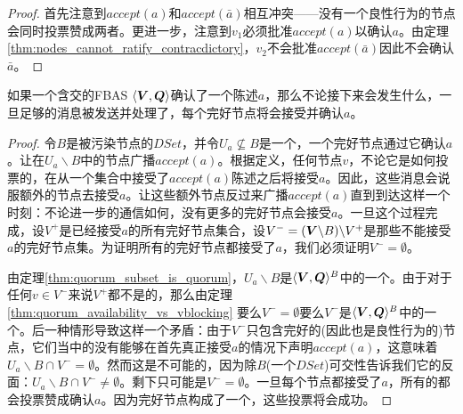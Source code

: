 \begin{proof}
	首先注意到$accept(a)$和$accept(\bar a)$相互冲突——没有一个良性行为的节点会同时投票赞成两者。更进一步，注意到$v_1$必须批准$accept(a)$以确认$a$。由定理\ref{thm:nodes_cannot_ratify_contracdictory}，$v_2$不会批准$accept(\bar a)$因此不会确认$\bar a$。
\end{proof}

\begin{theorem}\label{thm:confirmed_stats_keep_liveness}
	如果一个含{\quorum}交的FBAS $\langle{\bm V},{\bm Q}\rangle$确认了一个陈述$a$，那么不论接下来会发生什么，一旦足够的消息被发送并处理了，每个完好节点将会接受并确认$a$。
\end{theorem}

\begin{proof}
	令$B$是被污染节点的$DSet$，并令$U_a\not \subseteq B$是一个{\quorum}，一个完好节点通过它确认$a$。让在$U_a\backslash B$中的节点广播$accept(a)$。根据定义，任何节点$v$，不论它是如何投票的，在从一个{\vblock}集合中接受了$accept(a)$陈述之后将接受$a$。因此，这些消息会说服额外的节点去接受$a$。让这些额外节点反过来广播$accept(a)$直到到达这样一个时刻：不论进一步的通信如何，没有更多的完好节点会接受$a$。一旦这个过程完成，设$V^+$是已经接受$a$的所有完好节点集合，设$V^-=({\bm V}\backslash B)\backslash V^+$是那些不能接受$a$的完好节点集。为证明所有的完好节点都接受了$a$，我们必须证明$V^-=\emptyset$。

	由定理\ref{thm:quorum_subset_is_quorum}，$U_a\backslash B$是$\langle{\bm V},{\bm Q}\rangle^{B}$中的一个{\quorum}。由于对于任何$v\in V^-$来说$V^+$都不是{\vblock}的，那么由定理\ref{thm:quorum_availability_vs_vblocking} 要么$V^-=\emptyset$要么$V^-$是$\langle{\bm V},{\bm Q}\rangle^{B}$中的一个{\quorum}。后一种情形导致这样一个矛盾：由于$V^-$只包含完好的(因此也是良性行为的)节点，它们当中的没有能够在首先真正接受$a$的情况下声明$accept(a)$，这意味着$U_a\backslash B\cap V^-=\emptyset$。然而这是不可能的，因为除$B$(一个$DSet$){\quorum}可交性告诉我们它的反面：$U_a\backslash B\cap V^-\neq\emptyset$。剩下只可能是$V^-=\emptyset$。一旦每个节点都接受了$a$，所有的都会投票赞成确认$a$。因为完好节点构成了一个{\quorum}，这些投票将会成功。
\end{proof}


